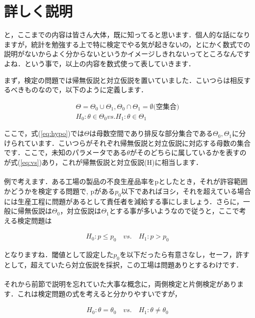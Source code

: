 \documentclass[11pt,a4paper,uplatex]{ujreport} 	%
\begin{document}
\section{詳しく説明}
と，ここまでの内容は皆さん大体，既に知ってると思います．個人的な話になりますが，統計を勉強する上で特に検定でやる気が起きないの，とにかく数式での説明がないからよく分からないというかイメージしきれないってところなんですよね．という事で，以上の内容を数式使って表していきます．

まず，検定の問題では帰無仮説と対立仮説を置いていました．こいつらは相反するべきものなので，以下のように定義します．

\begin{align}
  \Theta = \Theta_0 \cup \Theta_1, \Theta_0 \cap \Theta_1 = \emptyset \text{(空集合)}
  \label{eq:hypo}\\
  H_0: \theta \in \Theta_0 vs. H_1:\theta \in \Theta_1
  \label{eq:vs}
\end{align}

ここで，式(\ref{eq:hypo})では$\Theta$は母数空間であり排反な部分集合である$\Theta_0, \Theta_1$に分けられています．こいつらがそれぞれ帰無仮説と対立仮説に対応する母数の集合です．ここで，未知のパラメータである$\theta$がそのどちらに属しているかを表すのが式(\ref{eq:vs})あり，これが帰無仮説と対立仮説(H)に相当します．\\\\

例で考えます．ある工場の製品の不良生産品率をpとしたとき，それが許容範囲かどうかを検定する問題で, pがある$p_0$以下であればヨシ，それを超えている場合には生産工程に問題があるとして責任者を減給する事にしましょう．さらに，一般に帰無仮説は$\Theta_0$，対立仮説は$\Theta_1$とする事が多いようなので従うと，ここで考える検定問題は

\begin{align}
 H_0 :p\leq p_0 \quad vs. \quad H_1 :p> p_0 
\end{align}

となりますね．閾値として設定した$p_0$を以下だったら有意さなし，セーフ，許すとして，超えていたら対立仮説を採択，この工場は問題ありとするわけです．\\
\\

それから前節で説明を忘れていた大事な概念に，両側検定と片側検定があります．これは検定問題の式を考えると分かりやすいですが，

\begin{align}
  H_0:\theta = \theta_0\quad vs. \quad H_1:\theta \neq \theta_0
\end{align}
\end{document}
